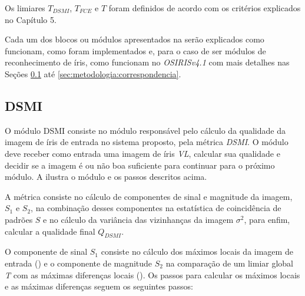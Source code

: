 \par Os limiares $T_{DSMI}$, $T_{FCE}$ e $T$ foram definidos de acordo com os critérios explicados no Capítulo 5.

\par Cada um dos blocos ou módulos apresentados na  serão explicados como funcionam, como foram implementados e, para o caso de ser módulos de reconhecimento de íris, como funcionam no \textit{OSIRISv4.1} com mais detalhes nas Seções \ref{sec:metodologia:dsmi} até \ref{sec:metodologia:correspondencia}.

\subsection{DSMI}\label{sec:metodologia:dsmi}

\par O módulo \acrshort{DSMI} consiste no módulo responsável pelo cálculo da qualidade da imagem de íris de entrada no sistema proposto, pela métrica \textit{\acrshort{DSMI}}. O módulo deve receber como entrada uma imagem de íris \textit{\acrshort{VL}}, calcular sua qualidade e decidir se a imagem é ou não boa suficiente para continuar para o próximo módulo. A  ilustra o módulo e os passos descritos acima.


\par A métrica consiste no cálculo de componentes de sinal e magnitude da imagem, $S_{1}$ e $S_{2}$, na combinação desses componentes na estatística de coincidência de padrões $S$ e no cálculo da variância das vizinhanças da imagem $\sigma^2$, para enfim, calcular a qualidade final $Q_{DSMI}$.

\par O componente de sinal $S_{1}$ consiste no cálculo dos máximos locais da imagem de entrada () e o componente de magnitude $S_{2}$ na comparação de um limiar global \textit{T} com as máximas diferenças locais (). Os passos para calcular os máximos locais e as máximas diferenças seguem os seguintes passos:

